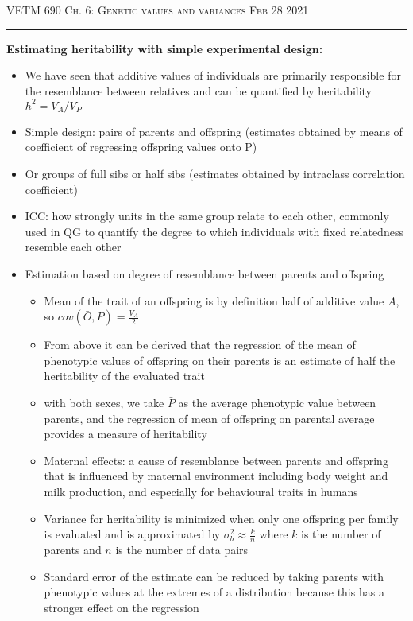 \documentclass[12pt]{amsart}
\begin{document}
\thispagestyle{empty}

{\scshape VETM 690} \hfill {\scshape \Large  Ch. 6: Genetic values and variances} \hfill {\scshape Feb 28 2021}
\medskip
\hrule
\bigskip

{\large \bf Estimating heritability with simple experimental design:}
\begin{itemize}
\item  We have seen that additive values of individuals are primarily responsible for the resemblance between relatives and can be quantified by heritability $h^2 = V_A/V_P$
\item Simple design: pairs of parents and offspring (estimates obtained by means of coefficient of regressing offspring values onto P) 
\item Or groups of full sibs or half sibs (estimates obtained by intraclass correlation coefficient) 
\item ICC: how strongly units in the same group relate to each other, commonly used in QG to quantify the degree to which individuals with fixed relatedness resemble each other 
\item Estimation based on degree of resemblance between parents and offspring
\begin{itemize}
\item Mean of the trait of an offspring is by definition half of additive value $A$, so $cov(\bar{O},P) = \frac{V_A}{2}$
\item From above it can be derived that the regression of the mean of phenotypic values of offspring on their parents is an estimate of half the heritability of the evaluated trait
\item with both sexes, we take $\bar{P}$ as the average phenotypic value between parents, and the regression of mean of offspring on parental average provides a measure of heritability
\item Maternal effects: a cause of resemblance between parents and offspring that is influenced by maternal environment including body weight and milk production, and especially for behavioural  traits in humans
\item Variance for heritability is minimized when only one offspring per family is evaluated and is approximated by $\sigma^2_b \approx \frac{k}{n}$ where $k$ is the number of parents and $n$ is the number of data pairs
\item Standard error of the estimate can be reduced by taking parents with phenotypic values at the extremes of a distribution because this has a stronger effect on the regression 

\end{itemize}
\end{itemize}
\end{document}
